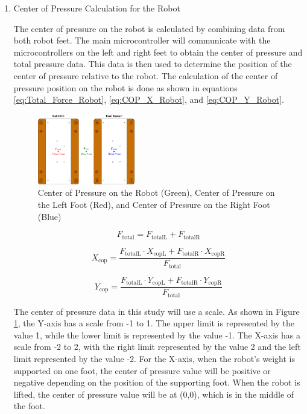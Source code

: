 \begin{enumerate}[label=\Alph*.]
    \item Center of Pressure Calculation for the Robot
    \label{subsec:pressurecentercalculation}

    \hspace*{1em} The center of pressure on the robot is calculated by combining data from both robot feet. The main microcontroller will communicate with the microcontrollers on the left and right feet to obtain the center of pressure and total pressure data. This data is then used to determine the position of the center of pressure relative to the robot. The calculation of the center of pressure position on the robot is done as shown in equations \ref{eq:Total_Force_Robot}, \ref{eq:COP_X_Robot}, and \ref{eq:COP_Y_Robot}.
    
    \begin{figure} [h] \centering
      \includegraphics[width=0.4\textwidth]{gambar/COP_Robot.png}
      \caption{Center of Pressure on the Robot (Green), Center of Pressure on the Left Foot (Red), and Center of Pressure on the Right Foot (Blue)}
      \label{fig:COP_Robot}
    \end{figure}

    \begin{equation}
      F_{\mathrm{total}} = F_{\mathrm{totalL}} + F_{\mathrm{totalR}}
      \label{eq:Total_Force_Robot}
    \end{equation}

    \begin{equation}
      X_{\mathrm{cop}} = \frac{F_{\mathrm{totalL}} \cdot X_{\mathrm{copL}} + F_{\mathrm{totalR}} \cdot X_{\mathrm{copR}}}{F_{\mathrm{total}}}
      \label{eq:COP_X_Robot}
    \end{equation}

    \begin{equation}
      Y_{\mathrm{cop}} = \frac{F_{\mathrm{totalL}} \cdot Y_{\mathrm{copL}} + F_{\mathrm{totalR}} \cdot Y_{\mathrm{copR}}}{F_{\mathrm{total}}}
      \label{eq:COP_Y_Robot}
    \end{equation}

    \hspace*{1em} The center of pressure data in this study will use a scale. As shown in Figure \ref{fig:COP_Robot}, the Y-axis has a scale from -1 to 1. The upper limit is represented by the value 1, while the lower limit is represented by the value -1. The X-axis has a scale from -2 to 2, with the right limit represented by the value 2 and the left limit represented by the value -2. For the X-axis, when the robot's weight is supported on one foot, the center of pressure value will be positive or negative depending on the position of the supporting foot. When the robot is lifted, the center of pressure value will be at (0,0), which is in the middle of the foot.


\end{enumerate}
